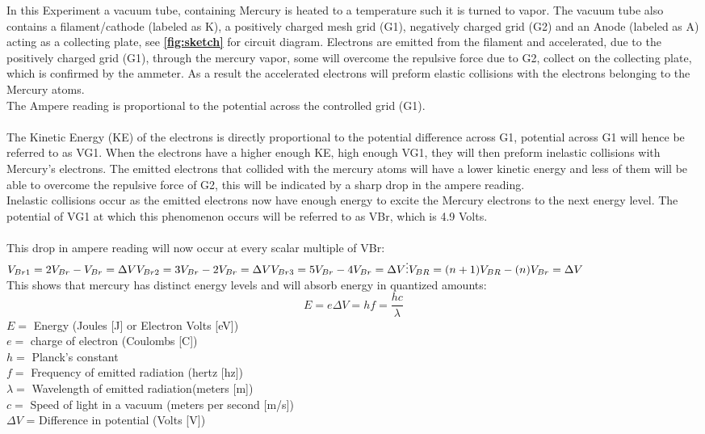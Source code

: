 \documentclass[12pt]{article}
\begin{document}
\par
In this Experiment a vacuum tube, containing Mercury is heated to a temperature
such it is turned to vapor. The vacuum tube also contains a filament/cathode (labeled as K),
a positively
charged mesh grid (G1), negatively charged grid (G2) and an Anode (labeled as A)
acting  as  a collecting plate, see
\textbf{\autoref{fig:sketch}}
for circuit diagram.
Electrons are emitted from the filament and accelerated, due to the positively
charged grid (G1), through the mercury vapor, some will overcome the repulsive force due to G2,
collect on the collecting plate, which is confirmed by the ammeter.
As a result the accelerated electrons will preform elastic collisions with the
electrons belonging to the Mercury atoms.
\\
The Ampere reading is proportional to the potential across the controlled grid (G1).
\\
\\
The Kinetic Energy (KE) of the electrons is directly proportional to the potential
difference across G1, potential across G1 will hence be referred to as VG1.
When the electrons have a higher enough KE, high enough VG1, they will
then preform inelastic collisions with Mercury's electrons. The emitted electrons that
collided with the mercury atoms
will have a lower kinetic energy and less of them will be able to overcome
the repulsive force of G2, this will be indicated by a sharp drop in the ampere reading.
\\
Inelastic collisions occur as the emitted electrons now have enough energy to
excite the Mercury electrons to the next energy level. The potential of VG1 at which this phenomenon occurs will
be referred to as VBr, which is 4.9 Volts.\cite{lecture}  \cite{fth}
\\
\\
This drop in ampere reading will now occur at every scalar multiple of VBr:
$ V_{Br1} = 2V_{Br} - V_{Br} = \Delta V \\
V_{Br2} = 3V_{Br} - 2V_{Br} = \Delta V \\
V_{Br3} = 5V_{Br} - 4V_{Br} = \Delta V \\
\vdots \\
V_{BR} = (n+1)V_{BR} - (n)V_{Br} = \Delta V \\
$
\\
This shows that mercury has distinct energy levels and will absorb energy in quantized
amounts:
\begin{equation}
   E = e\Delta V = hf = \frac{hc}{\lambda}
    \label{eq:temp}
\end{equation}
$E=$ Energy (Joules [J] or Electron Volts [eV])\\
$e=$ charge of electron (Coulombs [C]) \\
$h=$ Planck's constant \\
$f=$ Frequency of emitted radiation (hertz [hz]) \\
$\lambda=$ Wavelength of emitted radiation(meters [m]) \\
$c=$ Speed of light in a vacuum (meters per second [m/s])\\
$\Delta V$ = Difference in potential (Volts [V])\\
\end{document}
